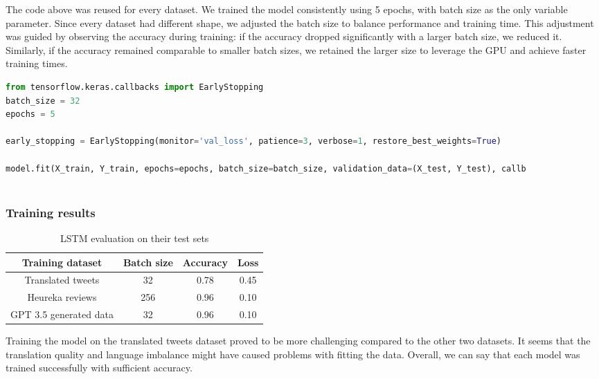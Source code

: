 \documentclass[11pt]{article}
\begin{document}
The code above was reused for every dataset. We trained the model consistently using 5 epochs, with batch size as the only variable parameter. Since every dataset had different shape, we adjusted the batch size to balance performance and training time. This adjustment was guided by observing the accuracy during training: if the accuracy dropped significantly with a larger batch size, we reduced it. Similarly, if the accuracy remained comparable to smaller batch sizes, we retained the larger size to leverage the GPU and achieve faster training times. 

\begin{lstlisting}[language=Python, caption=Fitting the model]
from tensorflow.keras.callbacks import EarlyStopping
batch_size = 32
epochs = 5

early_stopping = EarlyStopping(monitor='val_loss', patience=3, verbose=1, restore_best_weights=True)

model.fit(X_train, Y_train, epochs=epochs, batch_size=batch_size, validation_data=(X_test, Y_test), callb
    
\end{lstlisting}

\subsubsection{Training results}

\begin{table}[h!]
    \centering
    \begin{tabular}{|c|c|c|c|} %
        \hline
        \textbf{Training dataset} & \textbf{Batch size} & \textbf{Accuracy} & \textbf{Loss} \\
        \hline
        Translated tweets & 32 & 0.78 & 0.45 \\
        \hline
        Heureka reviews & 256 & 0.96 & 0.10 \\
        \hline
        GPT 3.5 generated data & 32 & 0.96 & 0.10 \\
        \hline
    \end{tabular}
    \caption{LSTM evaluation on their test sets}
    \label{tab:lstm_train_eval}
\end{table}

Training the model on the translated tweets dataset proved to be more challenging compared to the other two datasets. It seems that the translation quality and language imbalance might have caused problems with fitting the data. Overall, we can say that each model was trained successfully with sufficient accuracy.
\end{document}
